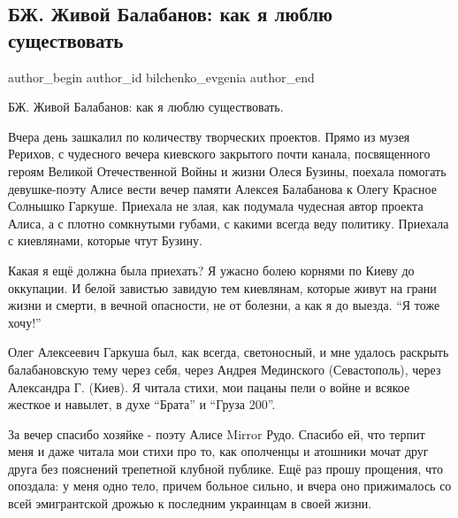  
 
 
 
 
 
\subsection{БЖ. Живой Балабанов: как я люблю существовать}
\label{sec:12_02_2022.tg.bilchenko_evgenia.1.balabanov}
 
\ifcmt
 author_begin
   author_id bilchenko_evgenia
 author_end
\fi

БЖ. Живой Балабанов: как я люблю существовать.

Вчера день зашкалил по количеству творческих проектов. Прямо из музея Рерихов,
с чудесного вечера киевского закрытого почти канала, посвященного героям
Великой Отечественной Войны и жизни Олеся Бузины, поехала помогать
девушке-поэту Алисе вести вечер памяти Алексея Балабанова к Олегу Красное
Солнышко Гаркуше. Приехала не злая, как подумала чудесная автор проекта Алиса,
а с плотно сомкнутыми губами, с какими всегда веду политику. Приехала с
киевлянами, которые чтут Бузину. 


Какая я ещё должна была приехать? Я ужасно болею корнями по Киеву до оккупации.
И белой завистью завидую тем киевлянам, которые живут на грани жизни и смерти,
в вечной опасности, не от болезни, а как я до выезда. \enquote{Я тоже хочу!}

Олег Алексеевич Гаркуша был, как всегда, светоносный, и мне удалось раскрыть
балабановскую тему через себя, через Андрея Мединского (Севастополь), через
Александра Г. (Киев). Я читала стихи, мои пацаны пели о войне и всякое жесткое
и навылет, в духе \enquote{Брата} и \enquote{Груза 200}.

За вечер спасибо хозяйке - поэту Алисе Mirror Рудо. Спасибо ей, что терпит меня
и даже читала мои стихи про то, как ополченцы и атошники мочат друг друга без
пояснений трепетной клубной публике.  Ещё раз прошу прощения, что опоздала: у
меня одно тело, причем больное сильно, и вчера оно прижималось со всей
эмигрантской дрожью к последним украинцам в своей жизни.

